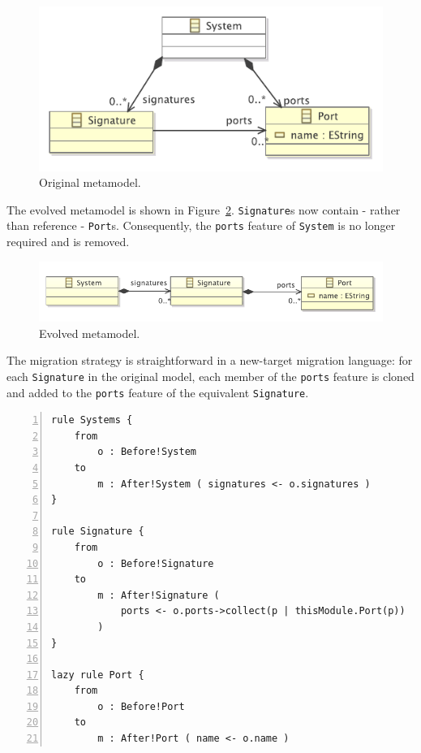 \begin{figure}[htbp]
  \centering
  \includegraphics[scale=0.75]{6.Evaluation/images/change_ref_to_cont_before.pdf}
  \caption{Original metamodel.}
  \label{fig:ref2cont_original_mm}
\end{figure}

The evolved metamodel is shown in Figure~\ref{fig:ref2cont_evolved_mm}. \texttt{Signature}s now contain - rather than reference - \texttt{Port}s. Consequently, the \texttt{ports} feature of \texttt{System} is no longer required and is removed.

\begin{figure}[htbp]
  \centering
  \includegraphics[scale=0.75]{6.Evaluation/images/change_ref_to_cont_after.pdf}
  \caption{Evolved metamodel.}
  \label{fig:ref2cont_evolved_mm}
\end{figure}

The migration strategy is straightforward in a new-target migration language: for each \texttt{Signature} in the original model, each member of the \texttt{ports} feature is cloned and added to the \texttt{ports} feature of the equivalent \texttt{Signature}.

\begin{lstlisting}[basicstyle=\ttfamily\footnotesize, flexiblecolumns=true, numbers=left, nolol=true, caption=Change R to C model migration in ATL, label=lst:ref2cont_atl, language=ATL, tabsize=2]
rule Systems {
	from
		o : Before!System
	to
		m : After!System ( signatures <- o.signatures )
}

rule Signature {
	from
		o : Before!Signature
	to
		m : After!Signature (
			ports <- o.ports->collect(p | thisModule.Port(p))
		)
}

lazy rule Port {
	from
		o : Before!Port
	to
		m : After!Port ( name <- o.name )
\end{lstlisting}

